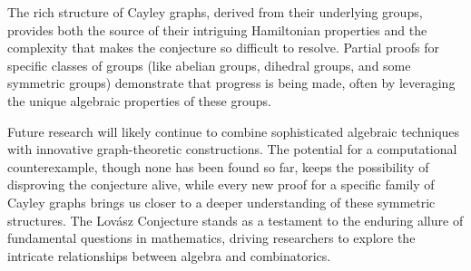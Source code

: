 \documentclass[12pt]{article}
\theoremstyle{remark}
\begin{document}
The rich structure of Cayley graphs, derived from their underlying groups, provides both the source of their intriguing Hamiltonian properties and the complexity that makes the conjecture so difficult to resolve. Partial proofs for specific classes of groups (like abelian groups, dihedral groups, and some symmetric groups) demonstrate that progress is being made, often by leveraging the unique algebraic properties of these groups.

Future research will likely continue to combine sophisticated algebraic techniques with innovative graph-theoretic constructions. The potential for a computational counterexample, though none has been found so far, keeps the possibility of disproving the conjecture alive, while every new proof for a specific family of Cayley graphs brings us closer to a deeper understanding of these symmetric structures. The Lovász Conjecture stands as a testament to the enduring allure of fundamental questions in mathematics, driving researchers to explore the intricate relationships between algebra and combinatorics.

\clearpage
\printbibliography
\end{document}
